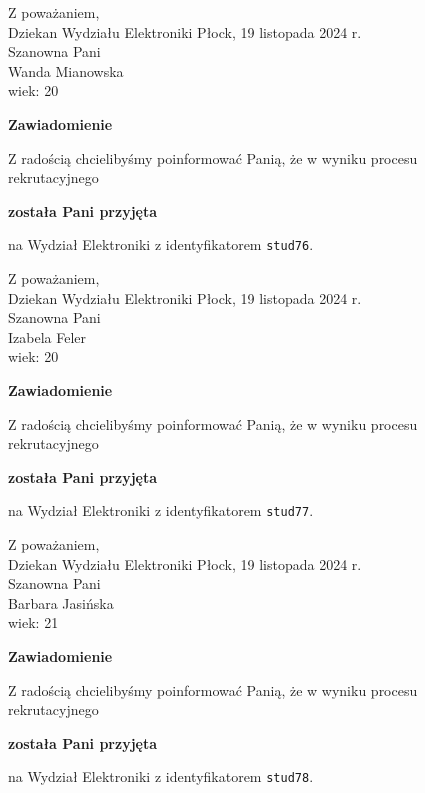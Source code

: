 \documentclass[12pt,a4paper]{article}
\begin{document}
\noindent
Z poważaniem,\\
Dziekan
Wydziału Elektroniki
\newpage
\hfill Płock, 19 listopada 2024 r.\\ 
\noindent 
Szanowna Pani \\
Wanda Mianowska \\
wiek: 20

\bigskip

\begin{center}
{\Large\textbf{Zawiadomienie}}
\end{center}
\bigskip
Z radością chcielibyśmy poinformować Panią, że w wyniku procesu rekrutacyjnego
\begin{center}
\textsf{\textbf{została Pani przyjęta}} 
\end{center}
na Wydział Elektroniki z identyfikatorem \verb|stud76|.
\vspace{2cm}

\noindent
Z poważaniem,\\
Dziekan
Wydziału Elektroniki
\newpage
\hfill Płock, 19 listopada 2024 r.\\ 
\noindent 
Szanowna Pani \\
Izabela Feler \\
wiek: 20

\bigskip

\begin{center}
{\Large\textbf{Zawiadomienie}}
\end{center}
\bigskip
Z radością chcielibyśmy poinformować Panią, że w wyniku procesu rekrutacyjnego
\begin{center}
\textsf{\textbf{została Pani przyjęta}} 
\end{center}
na Wydział Elektroniki z identyfikatorem \verb|stud77|.
\vspace{2cm}

\noindent
Z poważaniem,\\
Dziekan
Wydziału Elektroniki
\newpage
\hfill Płock, 19 listopada 2024 r.\\ 
\noindent 
Szanowna Pani \\
Barbara Jasińska \\
wiek: 21

\bigskip

\begin{center}
{\Large\textbf{Zawiadomienie}}
\end{center}
\bigskip
Z radością chcielibyśmy poinformować Panią, że w wyniku procesu rekrutacyjnego
\begin{center}
\textsf{\textbf{została Pani przyjęta}} 
\end{center}
na Wydział Elektroniki z identyfikatorem \verb|stud78|.
\vspace{2cm}
\end{document}
